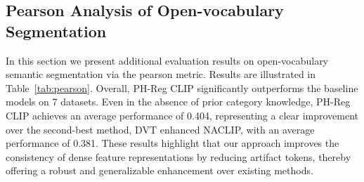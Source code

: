 \subsection{Pearson Analysis of Open-vocabulary Segmentation}\label{pearson}

\renewcommand{\arraystretch}{1.2}
\begin{table}[h]
\centering
\caption{\textbf{Open-vocabulary Semantic Segmentation Quantitative Comparison on 7 datasets.} We report the Pearson correlation coefficient for the zero-shot query against the one-hot ground truth labels. The results are averaged within each image, then averaged across images. Compared to mIoU, pearson does not require knowledge of all of the categories present an image (via softmax). The value ranges from -1 to 1, where 1 = perfect positive correlation, -1 = perfect negative correlation, and 0 = no linear correlation. The best result for each dataset is highlighted in \textbf{bolded}.}
\vspace{.1cm}
\vspace{-.2cm}
\label{tab:pearson}
\end{table}
In this section we present additional evaluation results on open-vocabulary semantic segmentation via the pearson metric. Results are illustrated in Table~\ref{tab:pearson}. Overall, PH-Reg CLIP significantly outperforms the baseline models on 7 datasets. Even in the absence of prior category knowledge, PH-Reg CLIP achieves an average performance of 0.404, representing a clear improvement over the second-best method, DVT enhanced NACLIP, with an average performance of 0.381. 
These results highlight that our approach improves the consistency of dense feature representations by reducing artifact tokens, thereby offering a robust and generalizable enhancement over existing methods.


